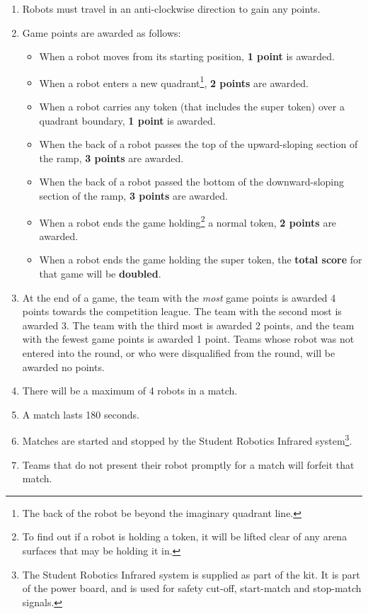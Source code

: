 \begin{enumerate}
\item Robots must travel in an anti-clockwise direction to gain any points.

\item Game points are awarded as follows:

\begin{itemize}
\item When a robot moves from its starting position, \textbf{1 point} is awarded.
\item When a robot enters a new quadrant\footnote{The back of the robot be beyond the imaginary quadrant line.}, \textbf{2 points} are awarded.
\item When a robot carries any token (that includes the super token) over a quadrant boundary, \textbf{1 point} is awarded.
\item When the back of a robot passes the top of the upward-sloping section of the ramp, \textbf{3 points} are awarded.
\item When the back of a robot passed the bottom of the downward-sloping section of the ramp, \textbf{3 points} are awarded.
\item When a robot ends the game holding\footnote{To find out if a robot is holding a token, it will be lifted clear of any arena surfaces that may be holding it in.} a normal token, \textbf{2 points} are awarded.
\item When a robot ends the game holding the super token, the \textbf{total score} for that game will be \textbf{doubled}.
\end{itemize}

\item At the end of a game, the team with the \emph{most} game points is awarded 4 points towards the competition league.
 The team with the second most is awarded 3.
 The team with the third most is awarded 2 points, and the team with the fewest game points is awarded 1 point.
 Teams whose robot was not entered into the round, or who were disqualified from the round, will be awarded no points.

\item There will be a maximum of 4 robots in a match.
\item A match lasts 180 seconds.
\item Matches are started and stopped by the Student Robotics Infrared system\footnote{The Student Robotics Infrared system is supplied as part of the kit. It is part of the power board, and is used for safety cut-off, start-match and stop-match signals.}.
\item Teams that do not present their robot promptly for a match will forfeit that match.
\end{enumerate}
